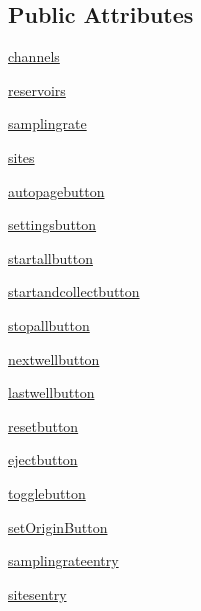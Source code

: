 \subsection*{Public Attributes}
\begin{DoxyCompactItemize}
\item 
\mbox{\hyperlink{classgui_1_1_manual_page_aab87bc8a54f5de4fc44615a948fa233d}{channels}}
\item 
\mbox{\hyperlink{classgui_1_1_manual_page_a43d4459abfcb563c8d9e66fadd6923da}{reservoirs}}
\item 
\mbox{\hyperlink{classgui_1_1_manual_page_a315727f0e09e6594828808baa27209e0}{samplingrate}}
\item 
\mbox{\hyperlink{classgui_1_1_manual_page_a96e8653d2f2fe2196dca26a773ef83ec}{sites}}
\item 
\mbox{\hyperlink{classgui_1_1_manual_page_a79da4eaba5adc9eab0ceb2da294a44d7}{autopagebutton}}
\item 
\mbox{\hyperlink{classgui_1_1_manual_page_a95bb61e93e82d7722766d14e7fe04fac}{settingsbutton}}
\item 
\mbox{\hyperlink{classgui_1_1_manual_page_acfc1643c1328f33fa3db82bf1a5b9cda}{startallbutton}}
\item 
\mbox{\hyperlink{classgui_1_1_manual_page_ab66d397db117e8dbcd0fd5ccfba0b015}{startandcollectbutton}}
\item 
\mbox{\hyperlink{classgui_1_1_manual_page_afe2d1480867362b57bcec3347adf1fbb}{stopallbutton}}
\item 
\mbox{\hyperlink{classgui_1_1_manual_page_a7e31eb0aa8abe07fd58ffa23dd66f09e}{nextwellbutton}}
\item 
\mbox{\hyperlink{classgui_1_1_manual_page_a418b839487a1b648bae76ad0ebea00d2}{lastwellbutton}}
\item 
\mbox{\hyperlink{classgui_1_1_manual_page_ae22c796922aefb93994272b227fd10fa}{resetbutton}}
\item 
\mbox{\hyperlink{classgui_1_1_manual_page_a6b8c3928ebff8b759204cab6a5e701da}{ejectbutton}}
\item 
\mbox{\hyperlink{classgui_1_1_manual_page_a9b5e9798da4c657026ff9d64c8f9a6d4}{togglebutton}}
\item 
\mbox{\hyperlink{classgui_1_1_manual_page_a6c03f0f7104333595cc4ba6bc5990220}{set\+Origin\+Button}}
\item 
\mbox{\hyperlink{classgui_1_1_manual_page_ae5d04d35be909e3540b419dc4633aa20}{samplingrateentry}}
\item 
\mbox{\hyperlink{classgui_1_1_manual_page_abcc13c8b94e3f00c5dc484b69a98c9b6}{sitesentry}}

\end{DoxyCompactItemize}
